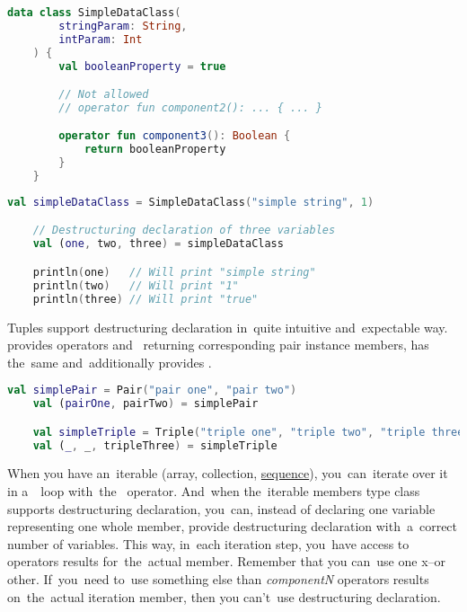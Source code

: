 \begin{lstlisting}[language=Kotlin, title={Data class with two parameters in the primary constructor and additional \mbit{component3}}]
    data class SimpleDataClass(
        stringParam: String,
        intParam: Int
    ) {
        val booleanProperty = true

        // Not allowed
        // operator fun component2(): ... { ... }

        operator fun component3(): Boolean {
            return booleanProperty
        }
    }
\end{lstlisting}

\begin{lstlisting}[language=Kotlin, title={Destructuring declaration behavior}]
    val simpleDataClass = SimpleDataClass("simple string", 1)

    // Destructuring declaration of three variables
    val (one, two, three) = simpleDataClass

    println(one)   // Will print "simple string"
    println(two)   // Will print "1"
    println(three) // Will print "true"
\end{lstlisting}

Tuples support destructuring declaration in~quite intuitive and~expectable way.
 provides operators  and~ returning corresponding pair instance members,  has the~same and~additionally provides .

\begin{lstlisting}[language=Kotlin]
    val simplePair = Pair("pair one", "pair two")
    val (pairOne, pairTwo) = simplePair

    val simpleTriple = Triple("triple one", "triple two", "triple three")
    val (_, _, tripleThree) = simpleTriple
\end{lstlisting}

\label{kotlindestdeclforloop}
When you have an~iterable (array, collection, \hyperref[kotlinsequence]{sequence}), you~can~iterate over it in a~~loop with~the~ operator.
And~when the~iterable members type class supports destructuring declaration, you~can, instead of declaring one variable representing one whole member, provide destructuring declaration with~a~correct number of variables.
This way, in~each iteration step, you~have access to~ operators results for~the~actual member.
Remember that you can~use one x--or other.
If~you~need to~use something else than \textit{componentN} operators results on~the~actual iteration member, then you can't~use destructuring declaration.

